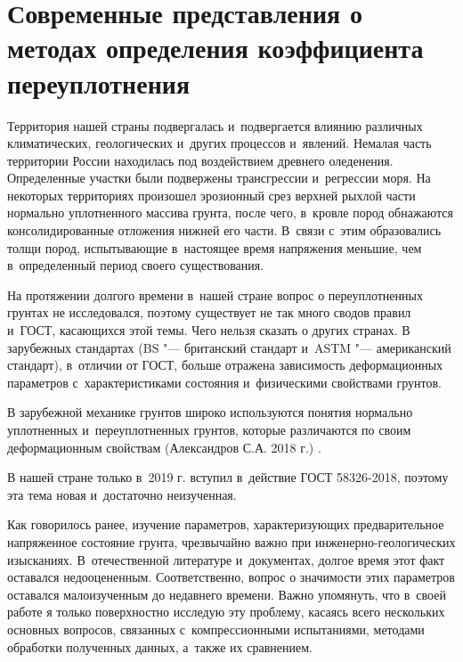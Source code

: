 \chapter{Современные представления о методах определения коэффициента переуплотнения}

Территория нашей страны подвергалась и~подвергается влиянию различных климатических, геологических и~других процессов и~явлений.
Немалая часть территории России находилась под воздействием древнего оледенения.
Определенные участки были подвержены трансгрессии и~регрессии моря.
На некоторых территориях произошел эрозионный срез верхней рыхлой части нормально уплотненного массива грунта, после чего, в~кровле пород обнажаются консолидированные отложения нижней его части.
В~связи с~этим образовались толщи пород, испытывающие в~настоящее время напряжения меньшие, чем в~определенный период своего существования.

На протяжении долгого времени в~нашей стране вопрос о переуплотненных грунтах не исследовался, поэтому существует не так много сводов правил и~ГОСТ, касающихся этой темы.
Чего нельзя сказать о других странах. 
В зарубежных стандартах (BS "--- британский стандарт и~ASTM "--- американский стандарт), в~отличии от ГОСТ, больше отражена зависимость деформационных параметров с~характеристиками состояния и~физическими свойствами грунтов.


В зарубежной механике грунтов широко используются понятия нормально уплотненных и~переуплотненных грунтов, которые различаются по своим деформационным свойствам (Александров С.А. 2018 г.) \cite{aleksandrov2018}.

В нашей стране только в~2019 г. вступил в~действие ГОСТ 58326-2018, поэтому эта тема новая и~достаточно неизученная.

Как говорилось ранее, изучение параметров, характеризующих предварительное напряженное состояние грунта, чрезвычайно важно при инженерно-геологических изысканиях.
В~отечественной литературе и~документах, долгое время этот факт оставался недооцененным. Соответственно, вопрос о значимости этих параметров оставался малоизученным до недавнего времени.
Важно упомянуть, что в~своей работе я только поверхностно исследую эту проблему,  касаясь всего нескольких основных вопросов, связанных с~компрессионными испытаниями, методами обработки полученных данных, а~также их сравнением.

